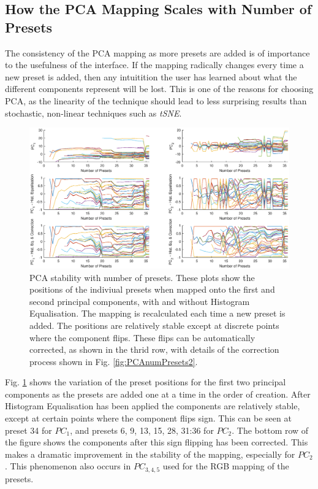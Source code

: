 \documentclass[11pt, oneside]{report}   	%
\begin{document}
\subsection{How the PCA Mapping Scales with Number of Presets}
The consistency of the PCA mapping as more presets are added is of importance to the usefulness of the interface. If the mapping radically changes every time a new preset is added, then any intuitition the user has learned about what the different components represent will be lost. This is one of the reasons for choosing PCA, as the linearity of the technique should lead to less surprising results than stochastic, non-linear techniques such as \emph{tSNE}.\\
\begin{figure}[h]
	\hspace{-80pt}
	\includegraphics[trim={0, 1cm, 0, 1cm}, clip, width = 8.5in]{PCAnumPresets1.eps}
	\caption{PCA stability with number of presets. These plots show the positions of the indiviual presets when mapped onto the first and second principal components, with and without Histogram Equalisation. The mapping is recalculated each time a new preset is added. The positions are relatively stable except at discrete points where the component flips. These flips can be automatically corrected, as shown in the thrid row, with details of the correction process shown in Fig. \ref{fig:PCAnumPresets2}.}
	\label{fig:PCAnumPresets}
		\vspace{-10pt}
\end{figure}
Fig. \ref{fig:PCAnumPresets} shows the variation of the preset positions for the first two principal components as the presets are added one at a time in the order of creation. After Histogram Equalisation has been applied the components are relatively stable, except at certain points where the component flips sign. This can be seen at preset 34 for $PC_1$, and presets 6, 9, 13, 15, 28, 31:36 for $PC_2$. The bottom row of the figure shows the components after this sign flipping has been corrected. This makes a dramatic improvement in the stability of the mapping, especially for $PC_2$. This phenomenon also occurs in $PC_{3,4,5}$ used for the RGB mapping of the presets.
\end{document}

